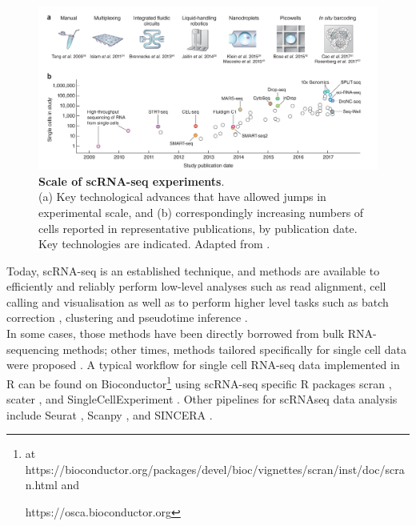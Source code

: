 \begin{figure}[h]
\centering
\includegraphics[width=15.5cm]{Chapter1/Fig/scrnaseq_technologies_svensson2018.jpg}
\caption[scRNA-seq technologies]{\textbf{Scale of scRNA-seq experiments}.\\
(a) Key technological advances that have allowed jumps in experimental scale, and (b) correspondingly increasing numbers of cells reported in representative publications, by publication date.
Key technologies are indicated.
Adapted from \cite{svensson2018exponential}.}
\label{fig:scrnaseq_technologies}
\end{figure}

Today, scRNA-seq is an established technique, and methods are available to efficiently and reliably perform low-level analyses such as read alignment, cell calling and visualisation \cite{maaten2008visualizing, mcinnes2018umap} as well as to perform higher level tasks such as batch correction \cite{haghverdi2018batch, butler2018integrating, nowotschin2019emergent, stuart2019comprehensive, welch2019single, polanski2020bbknn}, clustering \cite{kiselev2017sc3, traag2019louvain} and pseudotime inference \cite{haghverdi2016diffusion}.\\

In some cases, those methods have been directly borrowed from bulk RNA-sequencing methods; other times, methods tailored specifically for single cell data were proposed \cite{stegle2015computational}.
A typical workflow for single cell RNA-seq data implemented in R can be found on Bioconductor\footnote{at https://bioconductor.org/packages/devel/bioc/vignettes/scran/inst/doc/scran.html and

https://osca.bioconductor.org} using scRNA-seq specific R packages scran \cite{lun2016step, risso2016scrnaseq}, scater \cite{mccarthy2017scater}, and SingleCellExperiment 
\cite{lun2019singlecellexperiment}.
Other pipelines for scRNAseq data analysis include 
Seurat \cite{butler2018integrating},
Scanpy \cite{wolf2018scanpy}, 
and SINCERA \cite{guo2015sincera}.


